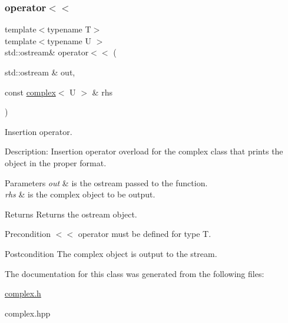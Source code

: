 \subsubsection{\texorpdfstring{operator$<$$<$}{operator<<}}
{\footnotesize\ttfamily template$<$typename T$>$ \\
template$<$typename U $>$ \\
std\+::ostream\& operator$<$$<$ (\begin{DoxyParamCaption}\item[{std\+::ostream \&}]{out,  }\item[{const \hyperlink{classcomplex}{complex}$<$ U $>$ \&}]{rhs }\end{DoxyParamCaption})\hspace{0.3cm}{\ttfamily [friend]}}



Insertion operator. 

Description\+: Insertion operator overload for the complex class that prints the object in the proper format. 
\begin{DoxyParams}{Parameters}
{\em out} & is the ostream passed to the function. \\
\hline
{\em rhs} & is the complex object to be output. \\
\hline
\end{DoxyParams}
\begin{DoxyReturn}{Returns}
Returns the ostream object. 
\end{DoxyReturn}
\begin{DoxyPrecond}{Precondition}
$<$$<$ operator must be defined for type T. 
\end{DoxyPrecond}
\begin{DoxyPostcond}{Postcondition}
The complex object is output to the stream. 
\end{DoxyPostcond}


The documentation for this class was generated from the following files\+:\begin{DoxyCompactItemize}
\item 
\hyperlink{complex_8h}{complex.\+h}\item 
complex.\+hpp\end{DoxyCompactItemize}
